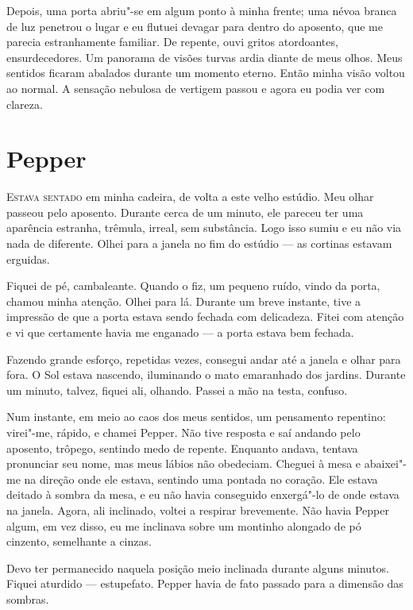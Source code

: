 Depois, uma porta abriu"-se em algum ponto à minha frente; uma névoa branca de luz penetrou o lugar e eu flutuei
devagar para dentro do aposento, que me parecia estranhamente familiar. De repente, ouvi gritos atordoantes,
ensurdecedores. Um panorama de visões turvas ardia diante de meus olhos. Meus sentidos ficaram abalados durante um momento
eterno. Então minha visão voltou ao normal. A sensação nebulosa de vertigem passou e agora eu podia ver com clareza.


\clearpage

\chapter{Pepper}

\textsc{Estava sentado} em minha cadeira, de volta a este velho estúdio. Meu olhar passeou pelo aposento. Durante cerca de um
minuto, ele pareceu ter uma aparência estranha, trêmula, irreal, sem substância. Logo isso sumiu e eu não via nada de
diferente. Olhei para a janela no fim do estúdio --- as cortinas estavam erguidas.

Fiquei de pé, cambaleante. Quando o fiz, um pequeno ruído, vindo da porta, chamou minha atenção. Olhei para lá. Durante
um breve instante, tive a impressão de que a porta estava sendo fechada com delicadeza. Fitei com atenção e vi que
certamente havia me enganado --- a porta estava bem fechada.

Fazendo grande esforço, repetidas vezes, consegui andar até a janela e olhar para fora. O Sol estava nascendo,
iluminando o mato emaranhado dos jardins. Durante um minuto, talvez, fiquei ali, olhando. Passei a mão na testa,
confuso.

Num instante, em meio ao caos dos meus sentidos, um pensamento repentino: virei"-me, rápido, e chamei Pepper. Não
tive resposta e saí andando pelo aposento, trôpego, sentindo medo de repente. Enquanto andava, tentava pronunciar seu
nome, mas meus lábios não obedeciam. Cheguei à mesa e abaixei"-me na direção onde ele estava, sentindo uma pontada no
coração. Ele estava deitado à sombra da mesa, e eu não havia conseguido enxergá"-lo de onde estava na janela. Agora, ali
inclinado, voltei a respirar brevemente. Não havia Pepper algum, em vez disso, eu me inclinava sobre um montinho
alongado de pó cinzento, semelhante a cinzas.

Devo ter permanecido naquela posição meio inclinada durante alguns minutos. Fiquei aturdido --- estupefato. Pepper havia
de fato passado para a dimensão das sombras.


